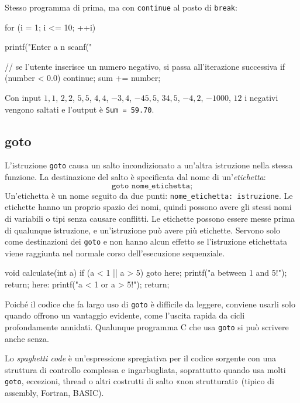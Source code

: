\documentclass[11pt,a4paper]{article}
\begin{document}
\begin{esempio}
Stesso programma di prima, ma con \lstinline|continue| al posto di \lstinline|break|:
\begin{codice}
for (i = 1; i <= 10; ++i)
{
    printf("Enter a n%
    scanf("%

    // se l'utente inserisce un numero negativo, si passa all'iterazione successiva
    if (number < 0.0)
    {
        continue;
    }
    sum += number;
}
\end{codice}
Con input $1{,}1$, $2{,}2$, $5{,}5$, $4{,}4$, $-3{,}4$, $-45{,}5$, $34{,}5$, $-4{,}2$, $-1000$, $12$ i negativi vengono saltati e l'output è \texttt{Sum = 59.70}.
\end{esempio}

\subsection{goto}

L'istruzione \lstinline|goto| causa un salto incondizionato a un'altra istruzione nella stessa funzione. La destinazione del salto è specificata dal nome di un'\emph{etichetta}:
\[
\texttt{goto nome\_etichetta;}
\]
Un'etichetta è un nome seguito da due punti: \texttt{nome\_etichetta: istruzione}. Le etichette hanno un proprio spazio dei nomi, quindi possono avere gli stessi nomi di variabili o tipi senza causare conflitti. Le etichette possono essere messe prima di qualunque istruzione, e un'istruzione può avere più etichette. Servono solo come destinazioni dei \lstinline|goto| e non hanno alcun effetto se l'istruzione etichettata viene raggiunta nel normale corso dell'esecuzione sequenziale.

\begin{codice}
void calculate(int a)
{
    if (a < 1 || a > 5)
        goto here;
    printf("a between 1 and 5!\n");
    return;
here: printf("a < 1 or a > 5!\n");
    return;
}
\end{codice}

\begin{osservazione}
Poiché il codice che fa largo uso di \lstinline|goto| è difficile da leggere, conviene usarli solo quando offrono un vantaggio evidente, come l'uscita rapida da cicli profondamente annidati. Qualunque programma C che usa \lstinline|goto| si può scrivere anche senza.
\end{osservazione}

Lo \emph{spaghetti code} è un'espressione spregiativa per il codice sorgente con una struttura di controllo complessa e ingarbugliata, soprattutto quando usa molti \lstinline|goto|, eccezioni, thread o altri costrutti di salto «non strutturati» (tipico di assembly, Fortran, BASIC).
\end{document}
